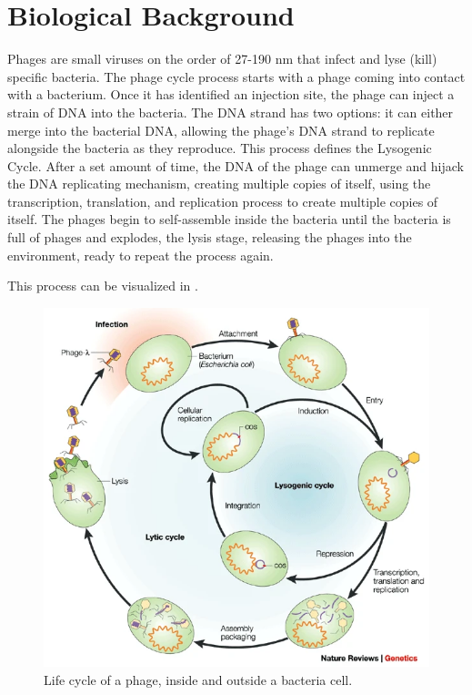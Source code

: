 \section{Biological Background}
Phages are small viruses on the order of 27-190 nm that infect and lyse (kill) specific bacteria.
The phage cycle process starts with a phage coming into contact with a bacterium.
Once it has identified an injection site, the phage can inject a strain of DNA into the bacteria.
The DNA strand has two options: it can either merge into the bacterial DNA, allowing the phage's DNA strand to replicate alongside the bacteria as they reproduce.
This process defines the Lysogenic Cycle.
After a set amount of time, the DNA of the phage can unmerge and hijack the DNA replicating mechanism, creating multiple copies of itself, using the transcription, translation, and replication process to create multiple copies of itself.
The phages begin to self-assemble inside the bacteria until the bacteria is full of phages and explodes, the lysis stage, releasing the phages into the environment, ready to repeat the process again. 

This process can be visualized in  \cite{campbellFutureBacteriophageBiology2003}.
\begin{figure}
    \centering
    \includegraphics[width=0.5\linewidth]{Figures/phage_life_cycle.png}
    \caption{Life cycle of a phage, inside and outside a bacteria cell.}
    \label{fig:phage_life_cycle}
\end{figure}